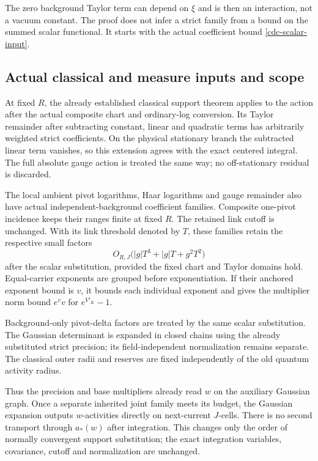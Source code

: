 \documentclass[11pt]{article}
\theoremstyle{remark}
\begin{document}
The zero background Taylor term can depend on $\xi$ and is then
an interaction, not a vacuum constant. The proof does not infer
a strict family from a bound on the summed scalar functional.
It starts with the actual coefficient bound
\eqref{cdc-scalar-input}.

\subsection{Actual classical and measure inputs and scope}
\label{cdc-matching-section}

At fixed $R$, the already established classical support theorem
applies to the action after the actual composite chart and
ordinary-log conversion. Its Taylor remainder after subtracting
constant, linear and quadratic terms has arbitrarily weighted
strict coefficients. On the physical stationary branch the
subtracted linear term vanishes, so this extension agrees with
the exact centered integral. The full absolute gauge action is
treated the same way; no off-stationary residual is discarded.

The local ambient pivot logarithms, Haar logarithms and gauge
remainder also have actual independent-background coefficient
families. Composite one-pivot incidence keeps their ranges
finite at fixed $R$. The retained link cutoff is unchanged.
With its link threshold denoted by $T$, these families retain
the respective small factors
\begin{equation}
 O_{R,J}\bigl(|g|T^3+|g|T+g^2T^2\bigr)
 \label{cdc-base-smallness}
\end{equation}
after the scalar substitution, provided the fixed chart and
Taylor domains hold. Equal-carrier exponents are grouped before
exponentiation. If their anchored exponent bound is $v$, it
bounds each individual exponent and gives the multiplier norm
bound $e^v v$ for $e^{V'_K}-1$.

Background-only pivot-delta factors are treated by the same
scalar substitution. The Gaussian determinant is expanded in
closed chains using the already substituted strict precision;
its field-independent normalization remains separate. The
classical outer radii and reserves are fixed independently of
the old quantum activity radius.

Thus the precision and base multipliers already read $w$ on
the auxiliary Gaussian graph. Once a separate inherited joint
family meets its budget, the Gaussian expansion outputs
$w$-activities directly on next-current $J$-cells. There is no
second transport through $a_*(w)$ after integration. This changes
only the order of normally convergent support substitution;
the exact integration variables, covariance, cutoff and
normalization are unchanged.
\end{document}
